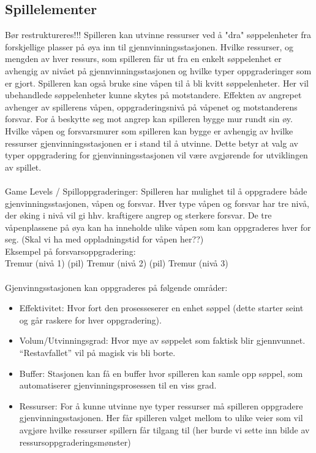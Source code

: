 

\subsection{Spillelementer}
Bør restruktureres!!! 
Spilleren kan utvinne ressurser ved å "dra" søppelenheter fra forskjellige plasser på øya inn til gjennvinningsstasjonen. Hvilke ressurser, og mengden av hver ressurs, som spilleren får ut fra en enkelt søppelenhet er avhengig av nivået på gjennvinningsstasjonen og hvilke typer oppgraderinger som er gjort. Spilleren kan også bruke sine våpen til å bli kvitt søppelenheter. Her vil ubehandlede søppelenheter kunne skytes på motstandere. Effekten av angrepet avhenger av spillerens våpen, oppgraderingsnivå på våpenet og motstanderens forsvar. For å beskytte seg mot angrep kan spilleren bygge mur rundt sin øy. Hvilke våpen og forsvarsmurer som spilleren kan bygge er avhengig av hvilke ressurser gjenvinningsstasjonen er i stand til å utvinne. Dette betyr at valg av typer oppgradering for gjenvinningsstasjonen vil være avgjørende for utviklingen av spillet.\\
\\
Game Levels / Spilloppgraderinger: 
Spilleren har mulighet til å oppgradere både gjenvinningsstasjonen, våpen og forsvar. Hver type våpen og forsvar har tre nivå, der øking i nivå vil gi hhv. kraftigere angrep og sterkere forsvar. De tre våpenplassene på øya kan ha inneholde ulike våpen som kan oppgraderes hver for seg. (Skal vi ha med oppladningstid for våpen her??)\\
Eksempel på forsvarsoppgradering:\\
Tremur (nivå 1) (pil) Tremur (nivå 2) (pil) Tremur (nivå 3)\\
\\
Gjenvinngsstasjonen kan oppgraderes på følgende områder:\\
\begin{itemize}
	\item Effektivitet: Hvor fort den prosesseserer en enhet søppel (dette starter seint og går raskere for hver oppgradering).
	\item Volum/Utvinningsgrad: Hvor mye av søppelet som faktisk blir gjennvunnet. “Restavfallet” vil på magisk vis bli borte.
	\item Buffer: Stasjonen kan få en buffer hvor spilleren kan samle opp søppel, som automatiserer gjenvinningsprosessen til en viss grad.
	\item Ressurser: For å kunne utvinne nye typer ressurser må spilleren oppgradere gjenvinningsstasjonen. Her får spilleren valget mellom to ulike veier som vil avgjøre hvilke ressurser spillern får tilgang til (her burde vi sette inn bilde av ressursoppgraderingsmønster)
\end{itemize}

